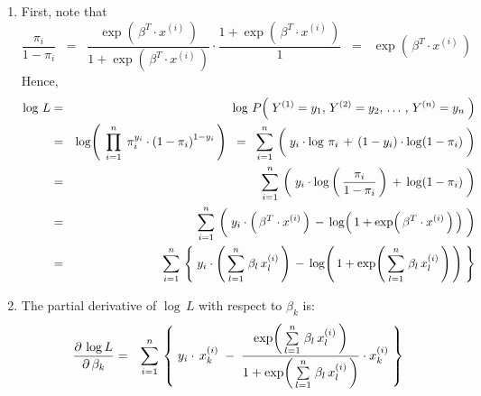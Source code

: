 \begin{enumerate}
\item
	First, note that
	\begin{equation*}
	\dfrac{\pi_{i}}{1 - \pi_{i}}
	\;\; = \;\;
		\dfrac{\exp\!\left(\,\beta^{T} \cdot x^{(i)}\,\right)}{1 + \exp\!\left(\,\beta^{T} \cdot x^{(i)}\,\right)}
		\cdot
		\dfrac{1 + \exp\!\left(\,\beta^{T} \cdot x^{(i)}\,\right)}{1}
	\;\; = \;\;
		\exp\!\left(\,\beta^{T} \cdot x^{(i)}\,\right)
	\end{equation*}
	Hence,
	\begin{eqnarray*}
	\log\,L
	&=&
		\log\,P\!\left(\;Y^{(1)} = y_{1},\,Y^{(2)} = y_{2},\,\ldots\,,\,Y^{(n)} = y_{n}\;\right)
	\\
	&=&
		\log\!\left(\;\,
			\overset{n}{\underset{i=1}{\prod}}\;\, \pi_{i}^{y_{i}} \cdot \left(1 - \pi_{i}\right)^{1-y_{i}}
			\,\right)
	\;\;=\;\;
		\overset{n}{\underset{i=1}{\sum}}\,
		\left(\;
			y_{i}\cdot\log\,\pi_{i}
			\, \overset{{\color{white}\vert}}{+} \,
			(1-y_{i})\cdot\log\!\left(1 - \pi_{i}\right)
			\;\right)	
	\\
	&=&
		\overset{n}{\underset{i=1}{\sum}}\,
		\left(\;
			y_{i}\cdot\log\left(\,\dfrac{\pi_{i}}{1 - \pi_{i}}\,\right)
			\, \overset{{\color{white}\vert}}{+} \,
			\log\!\left(1 - \pi_{i}\right)
			\;\right)	
	\\
	&=&
		\overset{n}{\underset{i=1}{\sum}}\,
		\left(\;
			y_{i}\cdot\left(\,\beta^{T} \cdot x^{(i)}\,\right)
			\, \overset{{\color{white}\vert}}{-} \,
			\log\!\left(\,1 + \exp\!\left(\,\beta^{T} \cdot x^{(i)}\,\right)\,\right)
			\;\right)	
	\\
	&=&
		\overset{n}{\underset{i=1}{\sum}}\,
		\left\{\;
			y_{i}\cdot\left(\,\overset{n}{\underset{l=1}{\sum}}\;\beta_{l}\,x^{(i)}_{l}\,\right)
			\, \overset{{\color{white}\vert}}{-} \,
			\log\!\left(\,1 + \exp\!\left(\,\overset{n}{\underset{l=1}{\sum}}\;\beta_{l}\,x^{(i)}_{l}\,\right)\,\right)
			\;\right\}	
	\end{eqnarray*}
\item
	The partial derivative of $\log\,L$ with respect to $\beta_{k}$ is:
	\begin{eqnarray*}
	\dfrac{\partial\,\log L}{\partial\,\beta_{k}}
	&=&
		\overset{n}{\underset{i=1}{\sum}}\,
		\left\{\;
			y_{i}\cdot\,x^{(i)}_{k}
			\; \overset{{\color{white}\vert}}{-} \;
			\dfrac{
				\exp\!\left(\,\overset{n}{\underset{l=1}{\sum}}\;\beta_{l}\,x^{(i)}_{l}\,\right)
				}{
				1 + \exp\!\left(\,\overset{n}{\underset{l=1}{\sum}}\;\beta_{l}\,x^{(i)}_{l}\,\right)
				}
			\cdot
			x^{(i)}_{k}
			\;\right\}	

\end{eqnarray*}
\end{enumerate}
